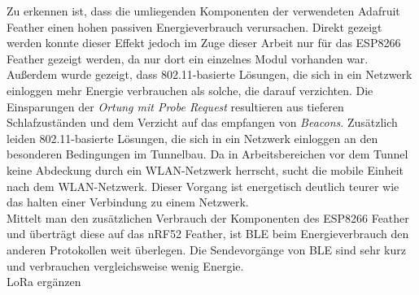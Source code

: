 Zu erkennen ist, dass die umliegenden Komponenten der verwendeten Adafruit Feather einen hohen passiven Energieverbrauch verursachen.
Direkt gezeigt werden konnte dieser Effekt jedoch im Zuge dieser Arbeit nur für das ESP8266 Feather gezeigt werden, da nur dort ein einzelnes Modul vorhanden war.\\
Außerdem wurde gezeigt, dass 802.11-basierte Lösungen, die sich in ein Netzwerk einloggen mehr Energie verbrauchen als solche, die darauf verzichten.
Die Einsparungen der \emph{Ortung mit Probe Request} resultieren aus tieferen Schlafzuständen und dem Verzicht auf das empfangen von \emph{Beacons}.
Zusätzlich leiden 802.11-basierte Lösungen, die sich in ein Netzwerk einloggen an den besonderen Bedingungen im Tunnelbau.
Da in Arbeitsbereichen vor dem Tunnel keine Abdeckung durch ein WLAN-Netzwerk herrscht, sucht die mobile Einheit nach dem WLAN-Netzwerk.
Dieser Vorgang ist energetisch deutlich teurer wie das halten einer Verbindung zu einem Netzwerk.\\
Mittelt man den zusätzlichen Verbrauch der Komponenten des ESP8266 Feather und überträgt diese auf das nRF52 Feather, ist BLE beim Energieverbrauch den anderen Protokollen weit überlegen.
Die Sendevorgänge von BLE sind sehr kurz und verbrauchen vergleichsweise wenig Energie.\\
LoRa ergänzen

